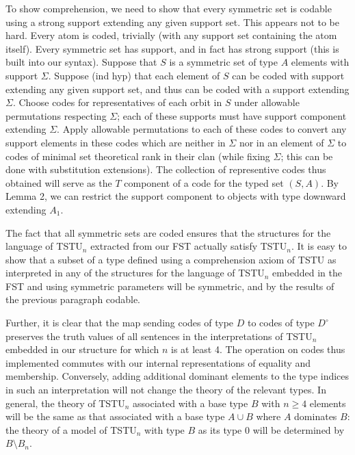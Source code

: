\documentclass{article}
\begin{document}
\begin{description}
To show comprehension, we need to show that every symmetric set is codable using a strong support extending any given support set.  This appears not to be hard.  Every atom is coded, trivially (with any support set containing the atom itself).    Every symmetric set has support, and in fact has strong support (this is built into our syntax).   Suppose that $S$ is a symmetric set of type $A$ elements with support $\Sigma$.  Suppose (ind hyp) that each element
of $S$ can be coded with support extending any given support set, and thus can be coded with a support extending $\Sigma$.  Choose codes for representatives of each orbit in $S$ under allowable permutations respecting $\Sigma$; each of these supports must have support component extending $\Sigma$.
Apply allowable permutations to each of these codes to convert any support elements in these codes which are neither in $\Sigma$ nor in an element of $\Sigma$ to codes of minimal set theoretical rank in their clan (while fixing $\Sigma$; this can be done with substitution extensions).  The collection of representive codes thus obtained will serve as the $T$ component
of a code for the typed set $(S,A)$.  By Lemma 2, we can restrict the support component to objects with type downward extending $A_1$.

The fact that all symmetric sets are coded ensures that the structures for the language of TSTU$_n$ extracted from our FST actually satisfy TSTU$_n$.  It is easy to show that
a subset of a type defined using a comprehension axiom of TSTU as interpreted in any of the structures for the language of TSTU$_n$ embedded in the FST  and using symmetric parameters will be symmetric, and by the results of the previous paragraph codable.

Further, it is clear that the map sending codes of type $D$ to codes of type $D^{\circ}$ preserves the truth values of all sentences in the interpretations of TSTU$_n$ 
embedded in our structure for which $n$ is at least 4.  The operation on codes thus implemented commutes with our internal representations of equality and membership.  Conversely, adding additional dominant elements to the type indices in such an interpretation will not change the theory
of the relevant types.  In general, the theory of TSTU$_n$ associated with a base type $B$ with $n \geq 4$ elements will be the same as that associated with a base type
$A \cup B$ where $A$ dominates $B$:  the theory of a model of TSTU$_n$ with type $B$ as its type 0 will be determined by $B \setminus B_n$.

\end{description}
\end{document}
